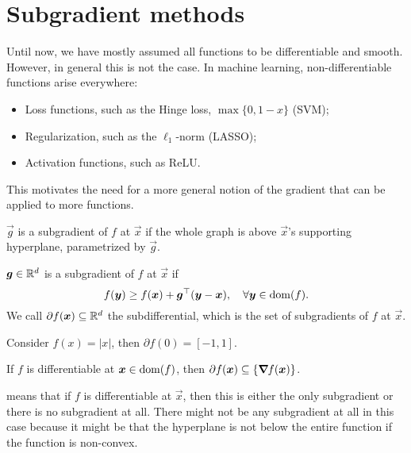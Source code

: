 \section{Subgradient methods}

Until now, we have mostly assumed all functions to be differentiable and smooth. However, in
general this is not the case. In machine learning, non-differentiable functions arise everywhere:
\begin{itemize}
    \item Loss functions, such as the Hinge loss, $\max\{ 0, 1-x \}$ (SVM);
    \item Regularization, such as the $\ell_1$-norm (LASSO);
    \item Activation functions, such as ReLU.
\end{itemize}

This motivates the need for a more general notion of the gradient that can be applied to more
functions.

\begin{marginfigure}[3.5cm]
    \centering
    \caption{$\vec{g}$ is a subgradient of $f$ at $\vec{x}$ if the whole graph is above $\vec{x}$'s supporting hyperplane, parametrized by $\vec{g}$.}
    \label{fig:subgradient}
\end{marginfigure}

\begin{definition}[Subgradient]
    $\bm{g} \in \mathbb{R}^d$ is a subgradient of $f$ at $\vec{x}$ if \[
        f(\bm{y}) \geq f(\bm{x}) + \bm{g}^\top(\bm{y} - \bm{x}), \quad \forall \bm{y} \in \mathrm{dom}(f).
    \]
    We call $\partial f(\bm{x}) \subseteq \mathbb{R}^d$ the subdifferential, which is the set of subgradients
    of $f$ at $\vec{x}$.
\end{definition}

\begin{example}
    Consider $f(x) = |x|$, then $\partial f(0) = [-1, 1]$.
\end{example}

\begin{lemma}
    \label{lem:diff-subdiff}

    If $f$ is differentiable at $\bm{x} \in \mathrm{dom}(f)$, then $\partial f(\bm{x}) \subseteq \{
        \bm{\nabla}_{\! } f(\bm{x}) \}$.
\end{lemma}

 means that if $f$ is differentiable at $\vec{x}$, then this is either the
only subgradient or there is no subgradient at all. There might not be any subgradient at all in this
case because it might be that the hyperplane is not below the entire function if the function is
non-convex.

